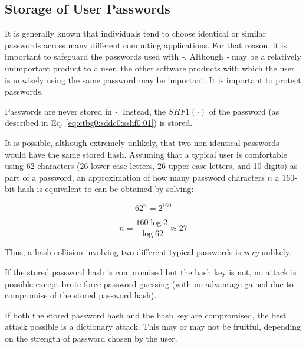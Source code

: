 \subsection{Storage of User Passwords}
\label{ctbg0:sddc0:ssup0}

It is generally known that individuals tend to choose identical or similar
passwords across many different computing applications.  For that reason, it
is important to safeguard the passwords used with
\emph{\productbasename{}-\productversion{}}.  Although 
\emph{\productbasename{}-\productversion{}} may be a relatively unimportant
product to a user, the other software products with which the user is
unwisely using the same password may be important.
It is important to protect passwords.

Passwords are never stored in \emph{\productbasename{}-\productversion{}}.
Instead, the $SHF1(\cdot{})$ of the password (as described in
Eq. \ref{eq:ctbg0:sddc0:sshf0:01}) is stored.

It is possible, although extremely unlikely, that two non-identical 
passwords would have the same stored hash.  Assuming that 
a typical user is comfortable using 62 characters (26 lower-case letters, 26 upper-case
letters, and 10 digits) as part of a password, an approximation of how many
password characters $n$ a 160-bit hash is equivalent to can be obtained by
solving:

\begin{equation}
62^n = 2^{160}
\end{equation}

\begin{equation}
n = \frac{160 \log 2}{\log 62} \approx 27
\end{equation}

\noindent{}Thus, a hash collision involving two different typical passwords is
\emph{very} unlikely.

If the stored password hash is compromised but the hash key is not, no attack
is possible except brute-force password guessing (with no advantage gained
due to compromise of the stored password hash).

If both the stored password hash and the hash key are compromised, the best
attack possible is a dictionary attack.  This may or may not be fruitful,
depending on the strength of password chosen by the user.


